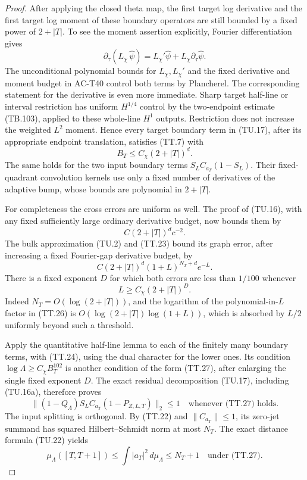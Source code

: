 \begin{proof}
After applying the closed theta map, the first target
log derivative and the first target log moment of these
boundary operators are still bounded by a fixed power
of \(2+|T|\).  To see the moment assertion explicitly,
Fourier differentiation gives
\[
       \partial_\tau(L_\chi\,\widehat\psi)
          =L_\chi'\widehat\psi
                                 +L_\chi\partial_\tau\widehat\psi.
 \]
The unconditional polynomial bounds for \(L_\chi,L_\chi'\)
and the fixed derivative and moment budget in AC-T40
control both terms by Plancherel.
The corresponding statement for the derivative is even
more immediate.
Sharp target half-line or interval restriction has
uniform \(H^{1/4}\) control by the two-endpoint estimate
(TB.103), applied to these whole-line \(H^1\) outputs.
Restriction does not increase the weighted \(L^2\) moment.
Hence every target boundary term in (TU.17), after its
appropriate endpoint translation, satisfies (TT.7) with
\[
                         B_T\leq C_\chi(2+|T|)^d.
 \tag{TT.24}
\]
The same holds for the two input boundary terms
\(S_LC_{a_T}(1-S_L)\).
Their fixed-quadrant convolution kernels use only a
fixed number of derivatives of the adaptive bump,
whose bounds are polynomial in \(2+|T|\).

For completeness the cross errors are uniform as well.
The proof of (TU.16), with any fixed sufficiently large
ordinary derivative budget, now bounds them by
\[
                         C(2+|T|)^d c^{-2}.
 \tag{TT.25}
\]
The bulk approximation (TU.2) and (TT.23) bound its
graph error, after increasing a fixed Fourier-gap
derivative budget, by
\[
          C(2+|T|)^d(1+L)^{N_T+d}e^{-L}.
 \tag{TT.26}
\]
There is a fixed exponent \(D\) for which both errors
are less than \(1/100\) whenever
\[
                         L\geq C_\chi(2+|T|)^D.
 \tag{TT.27}
\]
Indeed \(N_T=O(\log(2+|T|))\), and the logarithm of
the polynomial-in-\(L\) factor in (TT.26) is
\(O(\log(2+|T|)\log(1+L))\), which is absorbed by \(L/2\)
uniformly beyond such a threshold.

Apply the quantitative half-line lemma to each of the
finitely many boundary terms, with (TT.24), using the
dual character for the lower ones.
Its condition \(\log\Lambda\geq C_\chi B_T^{102}\)
is another condition of the form (TT.27), after enlarging
the single fixed exponent \(D\).
The exact residual decomposition (TU.17), including
(TU.16a), therefore proves
\[
       \|(1-Q_\Lambda)S_LC_{a_T}
                                (1-P_{Z,L,T})\|_2\leq1
               \quad\text{whenever (TT.27) holds}.
 \tag{TT.28}
\]
The input splitting is orthogonal.
By (TT.22) and \(\|C_{a_T}\|\leq1\), its zero-jet
summand has squared Hilbert--Schmidt norm at most \(N_T\).
The exact distance formula (TU.22) yields
\[
       \mu_\Lambda([T,T+1])
          \leq \int|a_T|^2\,d\mu_\Lambda
          \leq N_T+1
                   \quad\text{under (TT.27)}.
 \tag{TT.29}
\]


\end{proof}
